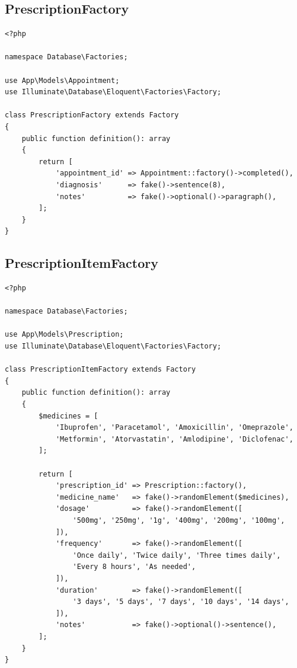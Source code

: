 \subsection{PrescriptionFactory}

\begin{lstlisting}[style=php, caption={\texttt{database/factories/PrescriptionFactory.php}.}]
<?php

namespace Database\Factories;

use App\Models\Appointment;
use Illuminate\Database\Eloquent\Factories\Factory;

class PrescriptionFactory extends Factory
{
    public function definition(): array
    {
        return [
            'appointment_id' => Appointment::factory()->completed(),
            'diagnosis'      => fake()->sentence(8),
            'notes'          => fake()->optional()->paragraph(),
        ];
    }
}
\end{lstlisting}

\subsection{PrescriptionItemFactory}

\begin{lstlisting}[style=php, caption={\texttt{database/factories/PrescriptionItemFactory.php}.}]
<?php

namespace Database\Factories;

use App\Models\Prescription;
use Illuminate\Database\Eloquent\Factories\Factory;

class PrescriptionItemFactory extends Factory
{
    public function definition(): array
    {
        $medicines = [
            'Ibuprofen', 'Paracetamol', 'Amoxicillin', 'Omeprazole',
            'Metformin', 'Atorvastatin', 'Amlodipine', 'Diclofenac',
        ];

        return [
            'prescription_id' => Prescription::factory(),
            'medicine_name'   => fake()->randomElement($medicines),
            'dosage'          => fake()->randomElement([
                '500mg', '250mg', '1g', '400mg', '200mg', '100mg',
            ]),
            'frequency'       => fake()->randomElement([
                'Once daily', 'Twice daily', 'Three times daily',
                'Every 8 hours', 'As needed',
            ]),
            'duration'        => fake()->randomElement([
                '3 days', '5 days', '7 days', '10 days', '14 days',
            ]),
            'notes'           => fake()->optional()->sentence(),
        ];
    }
}
\end{lstlisting}

